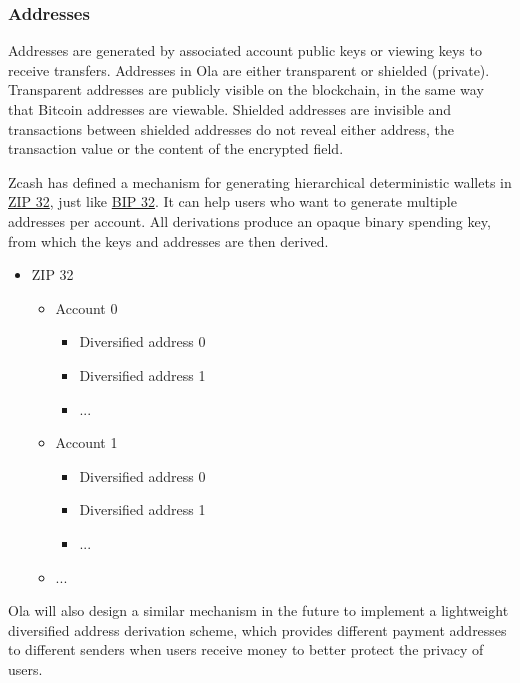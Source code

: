 \subsubsection{Addresses}\label{section: addresses}

Addresses are generated by associated account public keys or viewing keys to receive transfers. Addresses in Ola are either transparent or shielded (private). Transparent addresses are publicly visible on the blockchain, in the same way that Bitcoin addresses are viewable. Shielded addresses are invisible and transactions between shielded addresses do not reveal either address, the transaction value or the content of the encrypted field.

Zcash has defined a mechanism for generating hierarchical deterministic wallets in \href{https://zips.z.cash/zip-0032}{ZIP 32}, just like \href{https://github.com/bitcoin/bips/blob/master/bip-0032.mediawiki}{BIP 32}. It can help users who want to generate multiple addresses per account. All derivations produce an opaque binary spending key, from which the keys and addresses are then derived.

\begin{itemize}
    \item ZIP 32
        \begin{itemize}
            \item Account 0
                \begin{itemize}
                    \item Diversified address 0
                    \item Diversified address 1
                    \item ...
                \end{itemize}
            \item Account 1
                \begin{itemize}
                    \item Diversified address 0
                    \item Diversified address 1
                    \item ...
                \end{itemize}
            \item ...
        \end{itemize}
\end{itemize}

Ola will also design a similar mechanism in the future to implement a lightweight diversified address derivation scheme, which provides different payment addresses to different senders when users receive money to better protect the privacy of users.